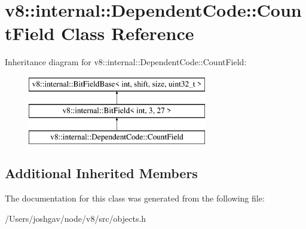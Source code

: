 \hypertarget{classv8_1_1internal_1_1_dependent_code_1_1_count_field}{}\section{v8\+:\+:internal\+:\+:Dependent\+Code\+:\+:Count\+Field Class Reference}
\label{classv8_1_1internal_1_1_dependent_code_1_1_count_field}
Inheritance diagram for v8\+:\+:internal\+:\+:Dependent\+Code\+:\+:Count\+Field\+:\begin{figure}[H]
\begin{center}
\leavevmode
\includegraphics[height=3.000000cm]{classv8_1_1internal_1_1_dependent_code_1_1_count_field}
\end{center}
\end{figure}
\subsection*{Additional Inherited Members}


The documentation for this class was generated from the following file\+:\begin{DoxyCompactItemize}
\item 
/\+Users/joshgav/node/v8/src/objects.\+h\end{DoxyCompactItemize}

